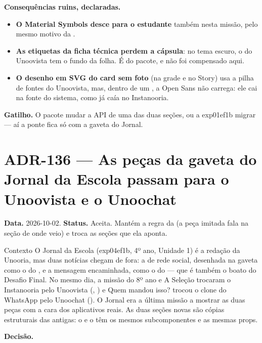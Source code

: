 \textbf{Consequências ruins, declaradas.}

\begin{itemize}
  \item \textbf{O Material Symbols desce para o estudante} também nesta
    missão, pelo mesmo motivo da .
  \item \textbf{As etiquetas da ficha técnica perdem a cápsula}: no tema
    escuro, o   do Unoovista tem o fundo da folha. É do
    pacote, e não foi compensado aqui.
  \item \textbf{O desenho em SVG do card sem foto} (na grade e no Story) usa
    a pilha de fontes do Unoovista, mas, dentro de um , a Open Sans
    não carrega: ele cai na fonte do sistema, como já caía no Instanooria.
\end{itemize}

\textbf{Gatilho.} O pacote mudar a API de uma das duas seções, ou a exp01ef1b
migrar --- aí a ponte  fica só com a gaveta do Jornal.

\section{ADR-136 --- As peças da gaveta do Jornal da Escola passam para o Unoovista e o Unoochat}
\label{adr:exp04ef1b-unoovista-unoochat}

\textbf{Data.} 2026-10-02. \textbf{Status.} Aceita. Mantém a regra da
 (a peça imitada fala na seção de onde veio) e troca as seções
que ela aponta.

\begin{especificacao}{Contexto}
O Jornal da Escola (exp04ef1b, 4º ano, Unidade 1) é a redação da Unooria, mas
duas notícias chegam de fora: a de rede social, desenhada na gaveta como o
 do , e a mensagem encaminhada, como o
 do  --- que é também o boato do Desafio
Final. No mesmo dia, a missão do 8º ano e A Seleção trocaram o Instanooria pelo
Unoovista (, ) e Quem mandou isso? trocou o clone do
WhatsApp pelo Unoochat (). O Jornal era a última missão a mostrar
as duas peças com a cara dos aplicativos reais. As duas seções novas são cópias
estruturais das antigas: o  e o  têm os mesmos
subcomponentes e as mesmas props.
\end{especificacao}

\textbf{Decisão.}

